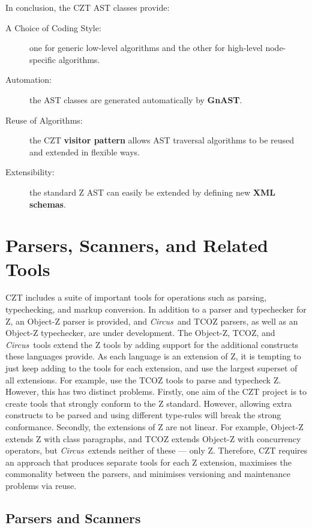 \documentclass{llncs}
\newcommand{\Circus}{{\sf\slshape Circus}}
\begin{document}
  In conclusion, the CZT AST classes provide:
  \begin{description}
    \item[A Choice of Coding Style:] one for generic low-level algorithms
      and the other for high-level node-specific algorithms.
    \item[Automation:] the AST classes are generated automatically by
      \textbf{GnAST}.
    \item[Reuse of Algorithms:] the CZT \textbf{visitor pattern} allows
      AST traversal algorithms to be reused and extended in flexible ways.
    \item[Extensibility:] the standard Z AST can easily be extended by
      defining new \textbf{XML schemas}.
  \end{description}


\section{Parsers, Scanners, and Related Tools}
\label{parsers}

  CZT includes a suite of important tools for operations such as
  parsing, typechecking, and markup conversion. In addition to a
  parser and typechecker for Z, an Object-Z parser is provided, and
  \Circus\ and TCOZ parsers, as well as an Object-Z typechecker, are
  under development.  The Object-Z, TCOZ, and \Circus\ tools extend
  the Z tools by adding support for the additional constructs these
  languages provide.  As each language is an
  extension of Z, it is tempting to just keep adding to the tools
  for each extension, and use the largest superset of all
  extensions. For example, use the TCOZ tools to parse and typecheck
  Z. However, this has two distinct problems. Firstly, one aim of the
  CZT project is to create tools that strongly conform to the Z
  standard. However, allowing extra constructs to be parsed and using
  different type-rules will break the strong conformance. Secondly, the
  extensions of Z are not linear. For example, Object-Z extends Z with
  class paragraphs, and TCOZ extends Object-Z with concurrency
  operators, but \Circus\ extends neither of these --- only
  Z. Therefore, CZT requires an approach that produces separate tools
  for each Z extension, maximises the commonality between the parsers,
  and minimises versioning and maintenance problems via reuse.

\subsection{Parsers and Scanners}
\end{document}
